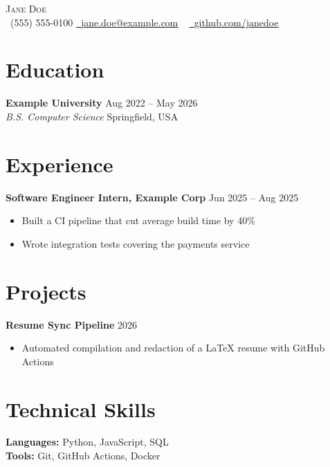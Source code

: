 \documentclass[letterpaper,10pt]{article}
\begin{document}
\begin{center}
    {\Huge \scshape Jane Doe} \\ \vspace{2pt}
    \small %
    \faPhone\ (555) 555-0100
    \href{mailto:jane.doe@example.com}{\faEnvelope~\underline{jane.doe@example.com}} ~
    \href{https://github.com/janedoe}{\faGithub~\underline{github.com/janedoe}}
    \vspace{-8pt}
\end{center}

\section{Education}
\textbf{Example University} \hfill Aug 2022 -- May 2026 \\
\textit{B.S. Computer Science} \hfill Springfield, USA

\section{Experience}
\textbf{Software Engineer Intern, Example Corp} \hfill Jun 2025 -- Aug 2025
\begin{itemize}[leftmargin=0.15in, label=\textbullet]
  \item Built a CI pipeline that cut average build time by 40\%
  \item Wrote integration tests covering the payments service
\end{itemize}

\section{Projects}
\textbf{Resume Sync Pipeline} \hfill 2026
\begin{itemize}[leftmargin=0.15in, label=\textbullet]
  \item Automated compilation and redaction of a LaTeX resume with GitHub Actions
\end{itemize}

\section{Technical Skills}
\textbf{Languages:} Python, JavaScript, SQL \\
\textbf{Tools:} Git, GitHub Actions, Docker
\end{document}
